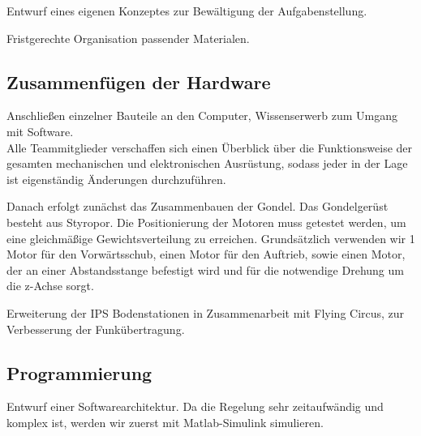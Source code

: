 \documentclass[lang=ngerman,inputenc=utf8,fontsize=10pt]{ldvarticle}
\begin{document}
Entwurf eines eigenen Konzeptes zur Bewältigung der Aufgabenstellung.

Fristgerechte Organisation passender Materialen.
 

\subsection*{Zusammenfügen der Hardware}

Anschließen einzelner Bauteile an den Computer, Wissenserwerb zum Umgang mit Software.\\
Alle Teammitglieder verschaffen sich einen Überblick über die Funktionsweise der gesamten mechanischen und elektronischen Ausrüstung, sodass jeder in der Lage ist eigenständig Änderungen durchzuführen.

Danach erfolgt zunächst das Zusammenbauen der Gondel. Das Gondelgerüst besteht aus Styropor. Die Positionierung der Motoren muss getestet werden, um eine gleichmäßige Gewichtsverteilung zu erreichen. Grundsätzlich verwenden wir 1 Motor für den Vorwärtsschub, einen Motor für den Auftrieb, sowie einen Motor, der an einer Abstandsstange befestigt wird und für die notwendige Drehung um die z-Achse sorgt.

Erweiterung der IPS Bodenstationen in Zusammenarbeit mit Flying Circus, zur Verbesserung der Funkübertragung. 
\newpage 
\subsection*{Programmierung}
Entwurf einer Softwarearchitektur.
Da die Regelung sehr zeitaufwändig und komplex ist, werden wir zuerst mit Matlab-Simulink simulieren.
\end{document}
